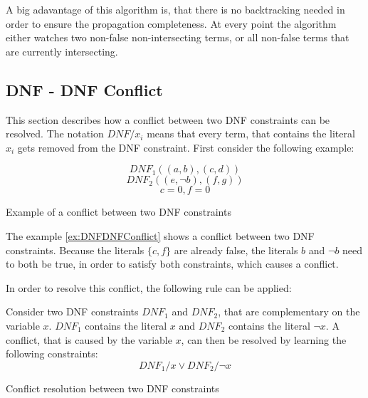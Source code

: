A big adavantage of this algorithm is, that there is no backtracking needed in order to ensure the propagation completeness. At every point the algorithm either watches two non-false non-intersecting terms, or all non-false terms that are currently intersecting.


\newpage
\subsection{DNF - DNF Conflict}

This section describes how a conflict between two DNF constraints can be resolved. The notation $DNF/x_i$ means that every term, that contains the literal $x_i$ gets removed from the DNF constraint. First consider the following example:

\begin{example}[!htb]
\begin{leftbar}
\begin{displaymath}
DNF_1 ((a,b),(c,d))
\end{displaymath}
\begin{displaymath}
DNF_2 ((e,\neg b),(f,g))
\end{displaymath}
\begin{displaymath}
c = 0, f = 0
\end{displaymath}
\end{leftbar}
\caption{Example of a conflict between two DNF constraints}
\label{ex:DNFDNFConflict}
\end{example}
The example \ref{ex:DNFDNFConflict} shows a conflict between two DNF constraints. Because the literals $\{c,f\}$ are already false, the literals $b$ and $\neg b$ need to both be true, in order to satisfy both constraints, which causes a conflict.

In order to resolve this conflict, the following rule can be applied:

\begin{lemma}[!htb]
\begin{leftbar}
Consider two DNF constraints $DNF_1$ and $DNF_2$, that are complementary on the variable $x$. $DNF_1$ contains the literal $x$ and $DNF_2$ contains the literal $\neg x$. A conflict, that is caused by the variable $x$, can then be resolved by learning the following constraints:
\begin{displaymath}
DNF_1 / x \vee DNF_2 / \neg x
\end{displaymath}
\end{leftbar}
\caption{Conflict resolution between two DNF constraints}
\label{le:DNFDNFConflict}
\end{lemma}


